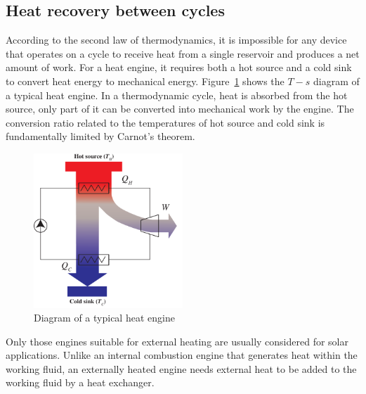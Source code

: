 %
\subsection{Heat recovery between cycles}
\label{sec:HRBC}

According to the second law of thermodynamics, it is impossible for any device that operates on a cycle to receive heat from a single reservoir and produces a net amount of work. For a heat engine, it requires both a hot source and a cold sink to convert heat energy to mechanical energy. 
Figure~\ref{fig:engines} shows the $T-s$ diagram of a typical heat engine. In a thermodynamic cycle, heat is absorbed from the hot source, only part of it can be converted into mechanical work by the engine. The conversion ratio related to the temperatures of hot source and cold sink is fundamentally limited by Carnot's theorem.

\begin{figure}[h]
\centering 
\includegraphics[width=0.5\textwidth]{fig/engines}
\caption{Diagram of a typical heat engine}\label{fig:engines}
\end{figure}

Only those engines suitable for external heating are usually considered for solar applications. Unlike an internal combustion engine that generates heat within the working fluid, an externally heated engine needs external heat to be added to the working fluid by a heat exchanger.

